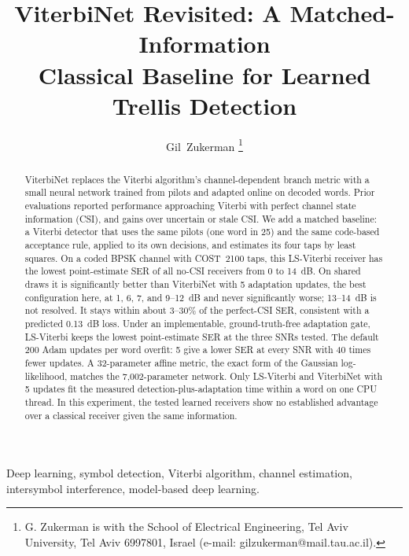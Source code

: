 \documentclass[journal]{IEEEtran}
\begin{document}
\title{ViterbiNet Revisited: A Matched-Information\\ Classical Baseline for Learned Trellis Detection}

\author{Gil~Zukerman%
\thanks{G. Zukerman is with the School of Electrical Engineering, Tel Aviv University, Tel Aviv 6997801, Israel (e-mail: gilzukerman@mail.tau.ac.il).}}


\maketitle

\begin{abstract}
ViterbiNet replaces the Viterbi algorithm's channel-dependent branch metric with a small neural network trained from pilots and adapted online on decoded words. Prior evaluations reported performance approaching Viterbi with perfect channel state information (CSI), and gains over uncertain or stale CSI. We add a matched baseline: a Viterbi detector that uses the same pilots (one word in 25) and the same code-based acceptance rule, applied to its own decisions, and estimates its four taps by least squares. On a coded BPSK channel with COST~2100 taps, this LS-Viterbi receiver has the lowest point-estimate SER of all no-CSI receivers from 0 to 14~dB. On shared draws it is significantly better than ViterbiNet with 5 adaptation updates, the best configuration here, at 1, 6, 7, and 9--12~dB and never significantly worse; 13--14~dB is not resolved. It stays within about 3--30\% of the perfect-CSI SER, consistent with a predicted 0.13~dB loss. Under an implementable, ground-truth-free adaptation gate, LS-Viterbi keeps the lowest point-estimate SER at the three SNRs tested. The default 200 Adam updates per word overfit: 5 give a lower SER at every SNR with 40 times fewer updates. A 32-parameter affine metric, the exact form of the Gaussian log-likelihood, matches the 7,002-parameter network. Only LS-Viterbi and ViterbiNet with 5 updates fit the measured detection-plus-adaptation time within a word on one CPU thread. In this experiment, the tested learned receivers show no established advantage over a classical receiver given the same information.
\end{abstract}

\begin{IEEEkeywords}
Deep learning, symbol detection, Viterbi algorithm, channel estimation, intersymbol interference, model-based deep learning.
\end{IEEEkeywords}
\end{document}

